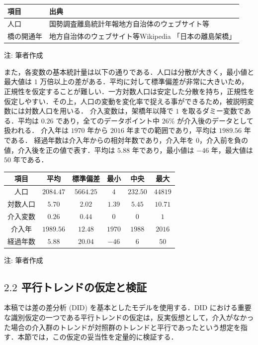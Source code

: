 \begin{longtable}[]{@{}ll@{}}
\toprule
項目 & 出典\tabularnewline
\midrule
\endhead
人口 & 国勢調査離島統計年報地方自治体のウェブサイト等\tabularnewline
橋の開通年 & 地方自治体のウェブサイト等Wikipedia
「日本の離島架橋」\tabularnewline
\bottomrule
\end{longtable}

注: 筆者作成

また，各変数の基本統計量は以下の通りである．人口は分散が大きく，最小値と最大値は
\(1\)
万倍以上の差がある．平均に対して標準偏差が非常に大きいため，正規性を仮定することが難しい．一方対数人口は安定した分散を持ち，正規性を仮定しやすい．その上，人口の変動を変化率で捉える事ができるため，被説明変数には対数人口を用いる．
介入変数は，架橋年以降で \(1\) を取るダミー変数である．平均は \(0.26\)
であり，全てのデータポイント中 \(26\%\) が介入後のデータとして扱われる．
介入年は \(1970\) 年から \(2016\) 年までの範囲であり，平均は \(1989.56\)
年である． 経過年数は介入年からの相対年数であり，介入年を
\(0\)，介入前を負の値，介入後を正の値で表す．平均は \(5.88\)
年であり，最小値は \(-46\) 年，最大値は \(50\) 年である．

\begin{longtable}[]{@{}cccccc@{}}
\toprule
項目 & 平均 & 標準偏差 & 最小 & 中央 & 最大\tabularnewline
\midrule
\endhead
人口 & \(2084.47\) & \(5664.25\) & \(4\) & \(232.50\) &
\(44819\)\tabularnewline
対数人口 & \(5.70\) & \(2.02\) & \(1.39\) & \(5.45\) &
\(10.71\)\tabularnewline
介入変数 & \(0.26\) & \(0.44\) & \(0\) & \(0\) & \(1\)\tabularnewline
介入年 & \(1989.56\) & \(12.48\) & \(1970\) & \(1988\) &
\(2016\)\tabularnewline
経過年数 & \(5.88\) & \(20.04\) & \(-46\) & \(6\) &
\(50\)\tabularnewline
\bottomrule
\end{longtable}

注: 筆者作成

\hypertarget{ux5e73ux884cux30c8ux30ecux30f3ux30c9ux306eux4eeeux5b9aux3068ux691cux8a3c}{%
\subsection{\texorpdfstring{\(2.2\)
平行トレンドの仮定と検証}{2.2 平行トレンドの仮定と検証}}\label{ux5e73ux884cux30c8ux30ecux30f3ux30c9ux306eux4eeeux5b9aux3068ux691cux8a3c}}

本稿では差の差分析 (DID) を基本としたモデルを使用する．DID
における重要な識別仮定の一つである平行トレンドの仮定は，反実仮想として，介入がなかった場合の介入群のトレンドが対照群のトレンドと平行であったという想定を指す．本節では，この仮定の妥当性を定量的に検証する．

